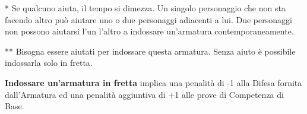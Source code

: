\begin{multicols}{2}

{*} Se qualcuno aiuta, il tempo si dimezza. Un singolo personaggio che non sta facendo altro può aiutare uno o due personaggi adiacenti a lui. Due personaggi non possono aiutarsi l'un l'altro a indossare un'armatura contemporaneamente.

{*}{*} Bisogna essere aiutati per indossare questa armatura. Senza aiuto è possibile indossarla solo in fretta.

\textbf{Indossare un'armatura in fretta} implica una penalità di -1 alla Difesa fornita dall'Armatura ed una penalità aggiuntiva di +1 alle prove di Competenza di Base.

\end{multicols}



\pagebreak


